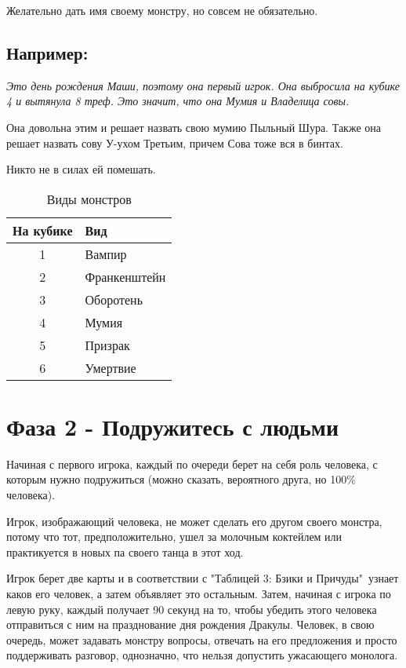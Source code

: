 \documentclass[twoside,twocolumn]{article}
\begin{document}
Желательно дать имя своему монстру, но совсем не обязательно.

\subsection*{Например:}
{\itshape
Это день рождения Маши, поэтому она первый игрок. Она выбросила на кубике 4 и вытянула 8 треф. Это значит, что она Мумия и Владелица совы.

Она довольна этим и решает назвать свою мумию Пыльный Шура. Также она решает назвать сову У-ухом Третьим, причем Сова тоже вся в бинтах.

Никто не в силах ей помешать.}

\begin{table}
\caption{Виды монстров}
\centering
\begin{tabular}{cl}
\toprule
\cmidrule(r){1-2}
На кубике & Вид \\
\midrule
1 & Вампир \\
2 & Франкенштейн \\
3 & Оборотень \\
4 & Мумия \\
5 & Призрак \\
6 & Умертвие \\
\bottomrule
\end{tabular}
\end{table}

\section*{Фаза 2 - Подружитесь с людьми}
Начиная с первого игрока, каждый по очереди берет на себя роль человека, с которым нужно подружиться (можно сказать, вероятного друга, но 100\% человека).

Игрок, изображающий человека, не может сделать его другом своего монстра, потому что тот, предположительно, ушел за молочным коктейлем или практикуется в новых па своего танца в этот ход.

Игрок берет две карты и в соответствии с "Таблицей 3: Бзики и Причуды"\ узнает каков его человек, а затем объявляет это остальным.
Затем, начиная с игрока по левую руку, каждый получает 90 секунд на то, чтобы убедить этого человека отправиться с ним на празднование дня рождения Дракулы.
Человек, в свою очередь, может задавать монстру вопросы, отвечать на его предложения и просто поддерживать разговор, однозначно, что нельзя допустить ужасающего монолога.
\end{document}
